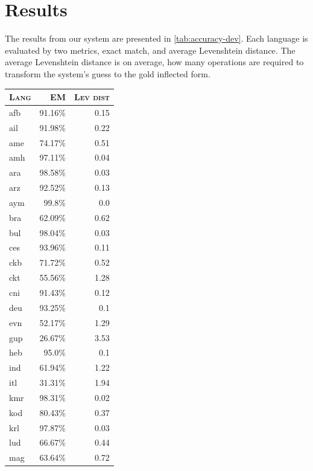 \documentclass[11pt,a4paper]{article}
\begin{document}


\section{Results}


The results from our system are presented in
\cref{tab:accuracy-dev}. Each language is evaluated by two metrics,
exact match, and average Levenshtein distance. The average Levenshtein
distance is on average, how many operations are required to transform
the system's guess to the gold inflected form.

\begin{table}[ht!]
\centering
\begin{tabular}{lrr}
\textsc{Lang} & \textsc{EM} & \textsc{Lev dist}  \\
  \hline
  afb & 91.16\% & 0.15 \\
  ail & 91.98\% & 0.22 \\
  ame & 74.17\% & 0.51 \\
  amh & 97.11\% & 0.04 \\
  ara & 98.58\% & 0.03 \\
  arz & 92.52\% & 0.13 \\
  aym & 99.8\% & 0.0 \\
  bra & 62.09\% & 0.62 \\
  bul & 98.04\% & 0.03 \\
  ces & 93.96\% & 0.11 \\
  ckb & 71.72\% & 0.52 \\
  ckt & 55.56\% & 1.28 \\
  cni & 91.43\% & 0.12 \\
  deu & 93.25\% & 0.1 \\
  evn & 52.17\% & 1.29 \\
  gup & 26.67\% & 3.53 \\
  heb & 95.0\% & 0.1 \\
  ind & 61.94\% & 1.22 \\
  itl & 31.31\% & 1.94 \\
  kmr & 98.31\% & 0.02 \\
  kod & 80.43\% & 0.37 \\
  krl & 97.87\% & 0.03 \\
  lud & 66.67\% & 0.44 \\
  mag & 63.64\% & 0.72 \\

\end{tabular}
\end{table}
\end{document}
